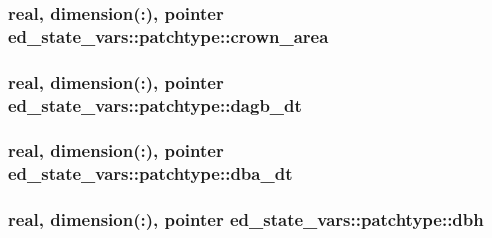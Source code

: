 \subsubsection[{\texorpdfstring{crown\+\_\+area}{crown_area}}]{\setlength{\rightskip}{0pt plus 5cm}real, dimension(\+:), pointer ed\+\_\+state\+\_\+vars\+::patchtype\+::crown\+\_\+area}\hypertarget{structed__state__vars_1_1patchtype_a24fb07506f728f126851f99abe1ee0b1}{}\label{structed__state__vars_1_1patchtype_a24fb07506f728f126851f99abe1ee0b1}
\subsubsection[{\texorpdfstring{dagb\+\_\+dt}{dagb_dt}}]{\setlength{\rightskip}{0pt plus 5cm}real, dimension(\+:), pointer ed\+\_\+state\+\_\+vars\+::patchtype\+::dagb\+\_\+dt}\hypertarget{structed__state__vars_1_1patchtype_aea917b14ed3927f0a337090a6c599b0a}{}\label{structed__state__vars_1_1patchtype_aea917b14ed3927f0a337090a6c599b0a}
\subsubsection[{\texorpdfstring{dba\+\_\+dt}{dba_dt}}]{\setlength{\rightskip}{0pt plus 5cm}real, dimension(\+:), pointer ed\+\_\+state\+\_\+vars\+::patchtype\+::dba\+\_\+dt}\hypertarget{structed__state__vars_1_1patchtype_a78a9bbdfaf2dd92209758e2907fb1bdd}{}\label{structed__state__vars_1_1patchtype_a78a9bbdfaf2dd92209758e2907fb1bdd}
\subsubsection[{\texorpdfstring{dbh}{dbh}}]{\setlength{\rightskip}{0pt plus 5cm}real, dimension(\+:), pointer ed\+\_\+state\+\_\+vars\+::patchtype\+::dbh}\hypertarget{structed__state__vars_1_1patchtype_afb1f7ed67f1dd1074cf453125b27370e}{}\label{structed__state__vars_1_1patchtype_afb1f7ed67f1dd1074cf453125b27370e}
